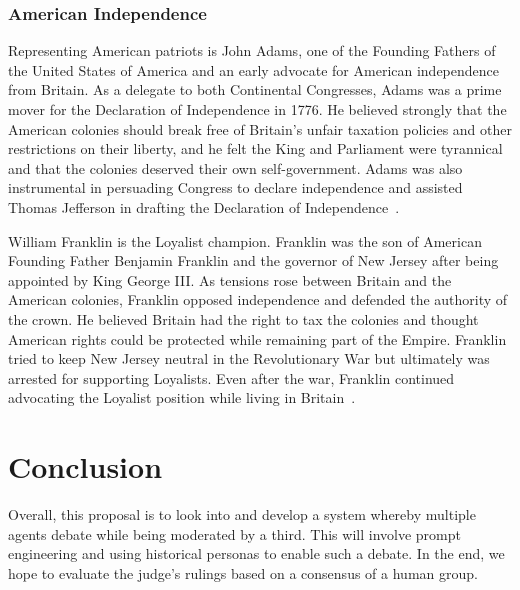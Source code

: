 \documentclass[jair,twoside,11pt,theapa]{article}
\begin{document}
\subsubsection{American Independence}
Representing American patriots is John Adams, one of the Founding Fathers of the United States of America and an early advocate for American independence from Britain.  As a delegate to both Continental Congresses, Adams was a prime mover for the Declaration of Independence in 1776. He believed strongly that the American colonies should break free of Britain's unfair taxation policies and other restrictions on their liberty, and he felt the King and Parliament were tyrannical and that the colonies deserved their own self-government.  Adams was also instrumental in persuading Congress to declare independence and assisted Thomas Jefferson in drafting the Declaration of Independence~.

William Franklin is the Loyalist champion.  Franklin was the son of American Founding Father Benjamin Franklin and the governor of New Jersey after being appointed by King George III.  As tensions rose between Britain and the American colonies, Franklin opposed independence and defended the authority of the crown.  He believed Britain had the right to tax the colonies and thought American rights could be protected while remaining part of the Empire. Franklin tried to keep New Jersey neutral in the Revolutionary War but ultimately was arrested for supporting Loyalists.  Even after the war, Franklin continued advocating the Loyalist position while living in Britain~.

\section{Conclusion}
Overall, this proposal is to look into and develop a system whereby multiple agents debate while being moderated by a third.  This will involve prompt engineering and using historical personas to enable such a debate.  In the end, we hope to evaluate the judge's rulings based on a consensus of a human group.

\vskip 0.2in


\end{document}
